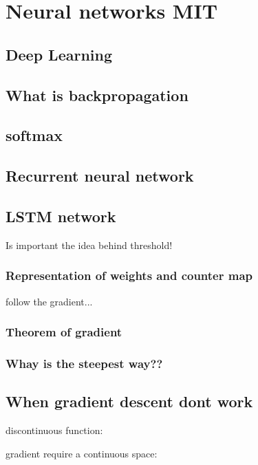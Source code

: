 \documentclass[10pt,a4paper]{article}
\begin{document}
\section{Neural networks MIT}



\subsection{Deep Learning}



\subsection{What is backpropagation}


\subsection{softmax}




\subsection{Recurrent neural network}




\subsection{LSTM network}

Is important the idea behind threshold!



\subsubsection{Representation of weights and counter map}

follow the gradient...


\subsubsection{Theorem of gradient}

\subsubsection{Whay is the steepest way??}


\subsection{When gradient descent dont work}

discontinuous function:

gradient require a continuous space:
\end{document}
